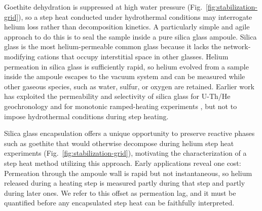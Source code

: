 Goethite dehydration is suppressed at high water pressure (Fig.~\ref{fig:stabilization-grid}), so a step heat conducted under hydrothermal conditions may interrogate helium loss rather than decomposition kinetics. 
A particularly simple and agile approach to do this is to seal the sample inside a pure silica glass ampoule. Silica glass is the most helium-permeable common glass \citep{norton1953,altemose1961} because it lacks the network-modifying cations that occupy interstitial space in other glasses. Helium permeation in silica glass is sufficiently rapid, so helium evolved from a sample inside the ampoule escapes to the vacuum system and can be measured while other gaseous species, such as water, sulfur, or oxygen are retained. Earlier work has exploited the permeability and selectivity of silica glass for U-Th/He geochronology \citep{yakubovich2020,yakubovich2021,yakubovich2024} and for monotonic ramped-heating experiments \citep{yakubovich2019}, but not to impose hydrothermal conditions during step heating. 

Silica glass encapsulation offers a unique opportunity to preserve reactive phases such as goethite that would otherwise decompose during helium step heat experiments (Fig.~\ref{fig:stabilization-grid}), motivating the characterization of a step heat method utilizing this approach. Early applications reveal one cost: Permeation through the ampoule wall is rapid but not instantaneous, so helium released during a heating step is measured partly during that step and partly during later ones. We refer to this offset as permeation lag, and it must be quantified before any encapsulated step heat can be faithfully interpreted.


